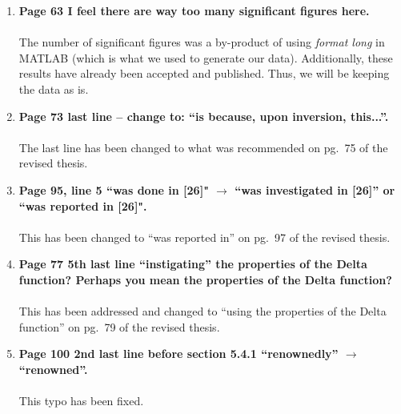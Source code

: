 \documentclass{article}
\begin{document}
\begin{enumerate}
         \item \textbf{Page 63 I feel there are way too many significant figures here.
    \\
    \\}
    The number of significant figures was a by-product of using \emph{format long} in MATLAB (which is what we used to generate our data). Additionally, these results have already been accepted and published. Thus, we will be keeping the data as is.
    
         \item \textbf{Page 73 last line -- change to: ``is because, upon inversion, this...''.
    \\
    \\}
    The last line has been changed to what was recommended on pg.~75 of the revised thesis.
    
         \item \textbf{Page 95, line 5 ``was done in [26]" $\rightarrow$ ``was investigated in [26]'' or ``was reported in [26]".
    \\
    \\}
    This has been changed to ``was reported in'' on pg.~97 of the revised thesis.
    
         \item \textbf{Page 77 5th last line ``instigating'' the properties of the Delta function? Perhaps you mean the properties of the Delta function?
    \\
    \\}
    This has been addressed and changed to ``using the properties of the Delta function'' on pg.~79 of the revised thesis.
    
         \item \textbf{Page 100 2nd last line before section 5.4.1 ``renownedly'' $\rightarrow$ ``renowned''.
    \\
    \\}
    This typo has been fixed.\\\\\\

\end{enumerate}
\end{document}

